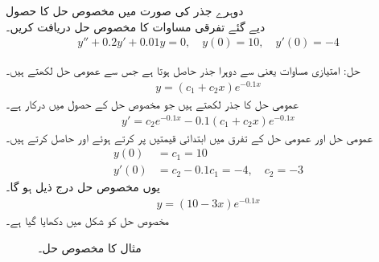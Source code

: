 \quad دوہرے جذر کی صورت میں مخصوص حل کا حصول\\
دیے گئے تفرقی مساوات کا مخصوص حل دریافت کریں۔
\begin{align*}
y''+0.2y'+0.01y=0, \quad y(0)=10, \quad y'(0)=-4
\end{align*}

حل: امتیازی مساوات  یعنی  سے   دوہرا جذر حاصل ہوتا ہے جس سے عمومی حل لکھتے ہیں۔
\begin{align*}
y=(c_1+c_2 x)e^{-0.1x}
\end{align*}
عمومی حل کا جذر لکھتے ہیں جو مخصوص حل کے حصول میں درکار ہے۔
\begin{align*}
y'=c_2 e^{-0.1x}-0.1(c_1+c_2 x)e^{-0.1x}
\end{align*}
عمومی حل اور عمومی حل کے تفرق  میں ابتدائی قیمتیں پر کرتے ہوئے  اور  حاصل کرتے ہیں۔
\begin{align*}
y(0)&=c_1=10\\
y'(0)&=c_2-0.1 c_1=-4, \quad c_2=-3
\end{align*}
یوں مخصوص حل درج ذیل ہو گا۔
\begin{align*}
y=(10-3x)e^{-0.1x}
\end{align*}
مخصوص حل کو شکل  میں دکھایا گیا ہے۔
\begin{figure}
\centering
{}
\caption{مثال  کا مخصوص حل۔}
\label{شکل_مثال_سادہ_دو_درجی_حقیقی_دوہرا_جذر}
\end{figure}

